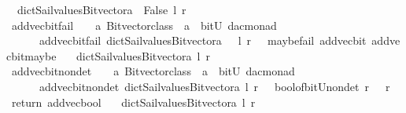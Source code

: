 \begin{isabellebody}
\ \ dict{\isacharunderscore}Sail{}{\isacharunderscore}values{\isacharunderscore}Bitvector{\isacharunderscore}a\ {\isacharparenleft}{\isacharplus}{\isacharparenright}\ False\ l\ r\ {\isacharparenright}{\isachardoublequoteclose}\isanewline
\isanewline
{}\isamarkupfalse%
\ add{\isacharunderscore}vec{\isacharunderscore}bit{\isacharunderscore}fail\ \ {\isacharcolon}{\isacharcolon}\ {\isachardoublequoteopen}\ {\isacharprime}a\ Bitvector{\isacharunderscore}class\ {\isasymRightarrow}\ {\isacharprime}a\ {\isasymRightarrow}\ bitU\ {\isasymRightarrow}{\isacharparenleft}{\isacharprime}d{\isacharcomma}{\isacharprime}a{\isacharcomma}{\isacharprime}c{\isacharparenright}monad\ {\isachardoublequoteclose}\ \ \ \isanewline
\ \ \ \ \ {\isachardoublequoteopen}\ add{\isacharunderscore}vec{\isacharunderscore}bit{\isacharunderscore}fail\ dict{\isacharunderscore}Sail{}{\isacharunderscore}values{\isacharunderscore}Bitvector{\isacharunderscore}a\ \ \ l\ r\ {\isacharequal}\ {\isacharparenleft}\ maybe{\isacharunderscore}fail\ {\isacharparenleft}{\isacharprime}{\isacharprime}add{\isacharunderscore}vec{\isacharunderscore}bit{\isacharprime}{\isacharprime}{\isacharparenright}\ {\isacharparenleft}add{\isacharunderscore}vec{\isacharunderscore}bit{\isacharunderscore}maybe\ \isanewline
\ \ dict{\isacharunderscore}Sail{}{\isacharunderscore}values{\isacharunderscore}Bitvector{\isacharunderscore}a\ l\ r{\isacharparenright}{\isacharparenright}{\isachardoublequoteclose}\isanewline
\isanewline
{}\isamarkupfalse%
\ add{\isacharunderscore}vec{\isacharunderscore}bit{\isacharunderscore}nondet\ \ {\isacharcolon}{\isacharcolon}\ {\isachardoublequoteopen}\ {\isacharprime}a\ Bitvector{\isacharunderscore}class\ {\isasymRightarrow}\ {\isacharprime}a\ {\isasymRightarrow}\ bitU\ {\isasymRightarrow}{\isacharparenleft}{\isacharprime}d{\isacharcomma}{\isacharprime}a{\isacharcomma}{\isacharprime}c{\isacharparenright}monad\ {\isachardoublequoteclose}\ \ \ \isanewline
\ \ \ \ \ {\isachardoublequoteopen}\ add{\isacharunderscore}vec{\isacharunderscore}bit{\isacharunderscore}nondet\ dict{\isacharunderscore}Sail{}{\isacharunderscore}values{\isacharunderscore}Bitvector{\isacharunderscore}a\ l\ r\ {\isacharequal}\ {\isacharparenleft}\ bool{\isacharunderscore}of{\isacharunderscore}bitU{\isacharunderscore}nondet\ r\ {\isasymbind}\ {\isacharparenleft}{\isasymlambda}\ r\ {\isachardot}\ \ return\ {\isacharparenleft}add{\isacharunderscore}vec{\isacharunderscore}bool\ \isanewline
\ \ dict{\isacharunderscore}Sail{}{\isacharunderscore}values{\isacharunderscore}Bitvector{\isacharunderscore}a\ l\ r{\isacharparenright}{\isacharparenright}{\isacharparenright}{\isachardoublequoteclose}\isanewline

\end{isabellebody}
